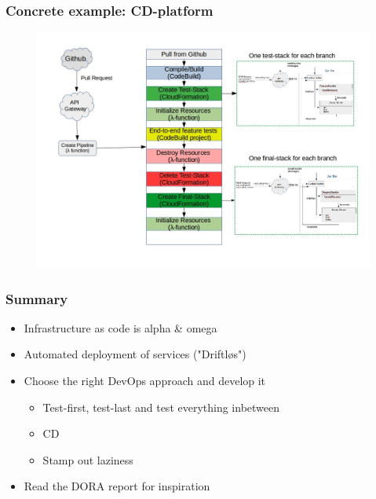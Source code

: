 \documentclass{beamer}
\begin{document}
\begin{frame}
\frametitle{Concrete example: CD-platform}
\begin{figure}
\includegraphics[scale=0.3]{cd.jpeg}
\end{figure}
\end{frame}

\begin{frame}

\frametitle{Summary}
\begin{itemize}
  \item Infrastructure as code is alpha \& omega
  \item Automated deployment of services ("Driftløs")
  \item Choose the right DevOps approach and develop it
  \begin{itemize}
    \item Test-first, test-last and test everything inbetween
    \item CD
    \item Stamp out laziness
  \end{itemize}
  \item Read the DORA report for inspiration
\end{itemize}
\end{frame}
\end{document}
